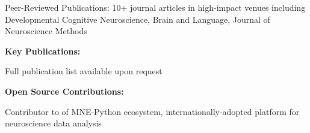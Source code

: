 

{\scriptsize Peer-Reviewed Publications: 10+ journal articles in high-impact venues including Developmental Cognitive Neuroscience, Brain and Language, Journal of Neuroscience Methods}

\textbf{Key Publications:}

\begin{refsection}
	\nocite{joo2021}
	\nocite{bosseler2021}
	\nocite{clarke2020}
	\nocite{appelhoff2019}
	\printbibliography[
	heading=none
	]
\end{refsection}

{\scriptsize Full publication list available upon request}

\textbf{Open Source Contributions:}

{\scriptsize Contributor to of MNE-Python ecosystem, internationally-adopted platform for neuroscience data analysis}


